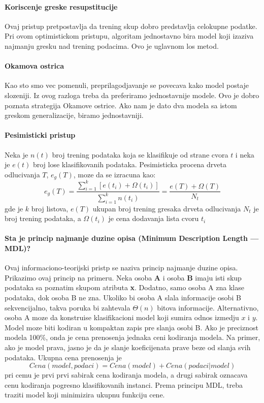 \documentclass[a4paper]{article}
\begin{document}
\paragraph{Koriscenje greske resupstitucije} Ovaj pristup pretpostavlja da trening skup dobro
predstavlja celokupne podatke. Pri ovom optimistickom pristupu, algoritam jednostavno bira model
koji izaziva najmanju gresku nad trening podacima. Ovo je uglavnom los metod.

\paragraph{Okamova ostrica} Kao sto smo vec pomenuli, preprilagodjavanje se povecava kako model
postaje slozeniji. Iz ovog razloga treba da preferiramo jednostavnije modele. Ovo je dobro poznata
strategija Okamove ostrice. Ako nam je dato dva modela sa istom greskom generalizacije, biramo
jednostavniji.

\paragraph{Pesimisticki pristup} Neka je \(n(t)\) broj trening podataka koja se klasifikuje od
strane cvora \(t\) i neka je \(e(t)\) broj lose klasifikovanih podataka. Pesimisticka procena drveta
odlucivanja \(T\), \(e_g(T)\), moze da se izracuna kao:
\[
    e_g(T) = \dfrac{\sum_{i=1}^{k}[e(t_i)+\Omega(t_i)]}{\sum_{i=1}^{k}n(t_i)}
        = \dfrac{e(T) + \Omega(T)}{N_t}
\]
gde je \(k\) broj listova, \(e(T)\) ukupan broj trening gresaka drveta odlucivanja \(N_t\) je broj
trening podataka, a \(\Omega(t_i)\) je cena dodavanja lista cvoru \(t_i\)

\paragraph{Sta je princip najmanje duzine opisa (Minimum Description Length --- MDL)?} Ovaj
informaciono-teorijski pristp se naziva princip najmanje duzine opisa. Prikazimo ovaj princip na
primeru. Neka osoba \textbf{A} i osoba \textbf{B} imaju isti skup podataka sa poznatim skupom
atributa \textbf{x}. Dodatno, samo osoba A zna klase podataka, dok osoba B ne zna. Ukoliko bi osoba
A slala informacije osobi B sekvencijalno, takva poruka bi zahtevala \(\Theta(n)\) bitova
informacije. Alternativno, osoba A moze da konstruise klasifikacioni model koji sumira odnos izmedju
\(x\) i \(y\). Model moze biti kodiran u kompaktan zapis pre slanja osobi B. Ako je preciznost
modela 100\%, onda je cena prenosenja jednaka ceni kodiranja modela. Na primer, ako je model prava,
jasno je da je slanje koeficijenata prave beze od slanja svih podataka. Ukupna cena prenosenja je
\[
    Cena(model,podaci) = Cena(model) + Cena(podaci|model)
\]
pri cemu je prvi prvi sabirak cena kodiranja modela, a drugi sabirak oznacava cenu kodiranja
pogresno klasifikovanih instanci. Prema principu MDL, treba traziti model koji minimizira ukupnu
funkciju cene.
\end{document}
